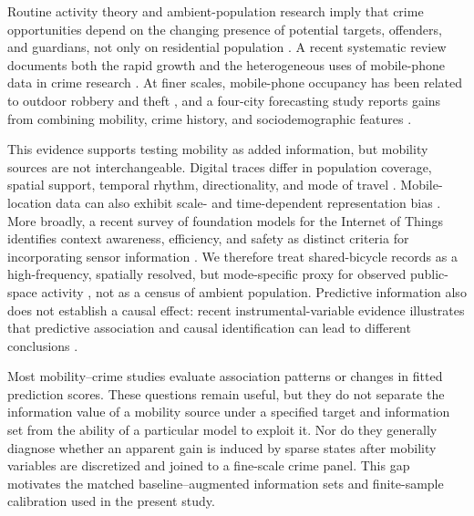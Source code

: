 Routine activity theory and ambient-population research imply that crime
opportunities depend on the changing presence of potential targets, offenders,
and guardians, not only on residential population
\citep{cohen1979routine,malleson2016ambient}.  A recent systematic review documents
both the rapid growth and the heterogeneous uses of mobile-phone data in crime
research \citep{okmi2023mobile}. At finer scales, mobile-phone occupancy has
been related to outdoor robbery and theft \citep{valente2024routines}, and a
four-city forecasting study reports gains from combining mobility, crime
history, and sociodemographic features \citep{albors2025mobility}.

This evidence supports testing mobility as added information, but mobility
sources are not interchangeable. Digital traces differ in population
coverage, spatial support, temporal rhythm, directionality, and mode of travel
\citep{luca2023mobilitysurvey,zhao2024directionality}. Mobile-location data
can also exhibit scale- and time-dependent representation bias
\citep{li2024mobilitybias}. More broadly, a recent survey of foundation
models for the Internet of Things identifies context awareness, efficiency,
and safety as distinct criteria for incorporating sensor information
\citep{wei2026iot}. We therefore treat shared-bicycle records as a
high-frequency, spatially resolved, but mode-specific proxy for observed
public-space activity \citep{xu2023bike,ivanovic2023bike}, not as a census of
ambient population. Predictive information also does not establish a causal
effect: recent instrumental-variable evidence illustrates that predictive
association and causal identification can lead to different conclusions
\citep{vachuska2025causal}.

Most mobility--crime studies evaluate association patterns or changes in
fitted prediction scores. These questions remain useful, but they do not
separate the information value of a mobility source under a specified target
and information set from the ability of a particular model to exploit it.
Nor do they generally diagnose whether an apparent gain is induced by sparse states after mobility
variables are discretized and joined to a fine-scale crime panel. This gap
motivates the matched baseline--augmented information sets and finite-sample
calibration used in the present study.

